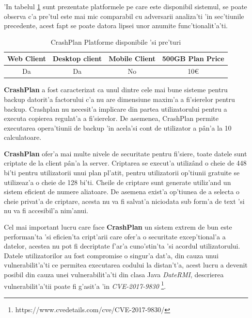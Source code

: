 \documentclass[12pt,a4paper,twoside]{report}
\begin{document}
'In tabelul \ref{table:crashplansystemtable} sunt prezentate platformele pe care este disponibil sistemul, se poate observa c'a pre'tul este mai mic comparabil cu adversarii analiza'ti 'in sec'tiunile precedente, acest fapt se poate datora lipsei unor anumite func'tionalit'a'ti.

\begin{table}[H]
\centering
\caption{CrashPlan Platforme  disponibile 'si pre'turi}
\begin{tabular}{|c|c|c|c|}          
\hline                      
 Web Client & Desktop client & Mobile Client & 500GB Plan Price\\ [0.5ex]   
\hline                            
Da & Da & No & 10\euro \\               
\hline                              
\end{tabular}
\label{table:crashplansystemtable}             
\end{table}

\textbf{CrashPlan} a fost caracterizat ca unul dintre cele mai bune sisteme pentru backup\cite{crashplan_review} datorit'a factorului c'a nu are dimensiune maxim'a a fi'sierelor pentru backup. Crashplan nu necesit'a implicare din partea utilizatorului pentru a executa copierea regulat'a a fi'sierelor. De asemenea, CrashPlan permite executarea opera'tiunii de backup 'in acela'si cont de utilizator a pân'a la 10 calculatoare.

 \textbf{CrashPlan} ofer'a mai multe nivele de securitate pentru fi'siere, toate datele sunt criptate de la client pân'a la server. Criptarea se execut'a utilizând o cheie de 448 bi'ti pentru utilizatorii unui plan pl'atit, pentru utilizatorii op'tiunii gratuite se utilizeaz'a o cheie de 128 bi'ti. Cheile de criptare sunt generate utiliz'and un sistem eficient de numere aliatoare.
De asemena exist'a op'tiunea de a selecta o cheie privat'a de criptare, acesta nu va fi salvat'a niciodata sub form'a de text 'si nu va fi accesibil'a nim'anui. 


Cel mai important lucru care face \textbf{CrashPlan} un sistem extrem de bun este performan'ta 'si eficien'ta cript'arii care ofer'a o securitate excep'tional'a a datelor, acestea nu pot fi decriptate f'ar'a cuno'stin'ta 'si acordul utilizatorului.
Datele utilizatorilor au fost compromise o singur'a dat'a, din cauza unui vulnerabilit'a'ti ce permitea executarea codului la distan't'a, acest lucru a devenit posibil  din cauza unei vulnerabilit'a'ti din clasa Java \textit{DateRMI}, descrierea vulnerabilit'a'tii poate fi g'asit'a 'in  {\it CVE-2017-9830} \footnote{https://www.cvedetails.com/cve/CVE-2017-9830/}.
\end{document}
